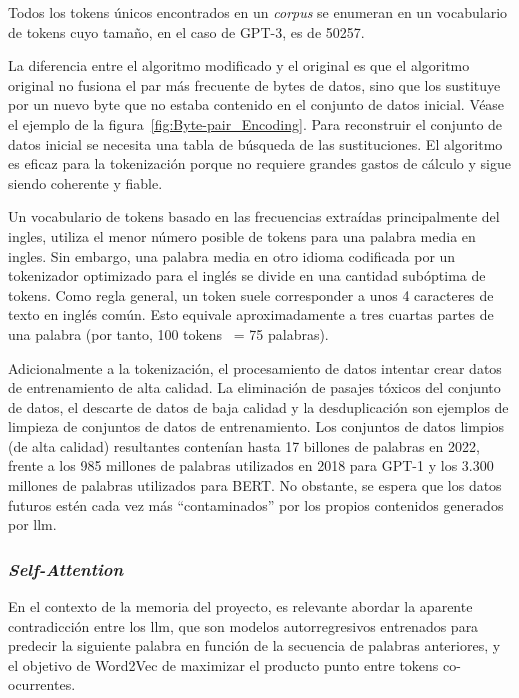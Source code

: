 Todos los tokens únicos encontrados en un \textit{corpus} se enumeran en un vocabulario de tokens cuyo tamaño, en el caso de GPT-3, es de 50257.

La diferencia entre el algoritmo modificado y el original es que el algoritmo original no fusiona el par más frecuente de bytes de datos, sino que los sustituye por un nuevo byte que no estaba contenido en el conjunto de datos inicial. Véase el ejemplo de la figura~\ref{fig:Byte-pair_Encoding}. Para reconstruir el conjunto de datos inicial se necesita una tabla de búsqueda de las sustituciones. El algoritmo es eficaz para la tokenización porque no requiere grandes gastos de cálculo y sigue siendo coherente y fiable.


Un vocabulario de tokens basado en las frecuencias extraídas principalmente del ingles, utiliza el menor número posible de tokens para una palabra media en ingles. Sin embargo, una palabra media en otro idioma codificada por un tokenizador optimizado para el inglés se divide en una cantidad subóptima de tokens. Como regla general, un token suele corresponder a unos 4 caracteres de texto en inglés común. Esto equivale aproximadamente a tres cuartas partes de una palabra (por tanto, 100 tokens ~= 75 palabras).

Adicionalmente a la tokenización, el procesamiento de datos intentar crear datos de entrenamiento de alta calidad. La eliminación de pasajes tóxicos del conjunto de datos, el descarte de datos de baja calidad y la desduplicación son ejemplos de limpieza de conjuntos de datos de entrenamiento. Los conjuntos de datos limpios (de alta calidad) resultantes contenían hasta 17 billones de palabras en 2022, frente a los 985 millones de palabras utilizados en 2018 para GPT-1 y los 3.300 millones de palabras utilizados para BERT. No obstante, se espera que los datos futuros estén cada vez más ``contaminados'' por los propios contenidos generados por \acrshort{llm}.

\subsubsection{\textit{Self-Attention}}

En el contexto de la memoria del proyecto, es relevante abordar la aparente contradicción entre los \acrfull{llm}, que son modelos autorregresivos entrenados para predecir la siguiente palabra en función de la secuencia de palabras anteriores, y el objetivo de Word2Vec de maximizar el producto punto entre tokens co-ocurrentes.


